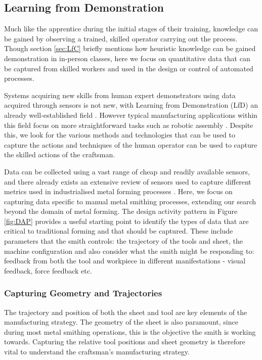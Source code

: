 \subsection{Learning from Demonstration} \label{sec:LfD} 
Much like the apprentice during the initial stages of their training, knowledge can be gained by observing a trained, skilled operator carrying out the process. Though section \ref{sec:LfC} briefly mentions how heuristic knowledge can be gained demonstration in in-person classes, here we focus on quantitative data that can be captured from skilled workers and used in the design or control of automated processes.

Systems acquiring new skills from human expert demonstrators using data acquired through sensors is not new, with Learning from Demonstration (LfD)  an already well-established field \citep{Ravichandar2020RecentDemonstration}. 
However typical manufacturing applications within this field focus on more straightforward tasks such as robotic assembly \citep{Zhu2018RobotSurvey}. Despite this, we look for the various methods and technologies that can be used to capture the actions and techniques of the human operator can be used to capture the skilled actions of the craftsman.

Data can be collected using a vast range of cheap and readily available sensors, and there already exists an extensive review of sensors used to capture different metrics used in industrialised metal forming processes \citep{Allwood2016Closed-loopForming}. Here, we focus on capturing data specific to manual metal smithing processes, extending our search beyond the domain of metal forming. The design activity pattern in Figure \ref{fig:DAP} provides a useful starting point to identify the types of data that are critical to traditional forming and that should be captured. These include parameters that the smith controls: the trajectory of the tools and sheet, the machine configuration and also consider what the smith might be responding to: feedback from both the tool and workpiece in different manifestations - visual feedback, force feedback etc. 

\subsubsection{Capturing Geometry and Trajectories}
The trajectory and position of both the sheet and tool are key elements of the manufacturing strategy. The geometry of the sheet is also paramount, since during most metal smithing operations, this is the objective the smith is working towards. Capturing the relative tool positions and sheet geometry is therefore vital to understand the craftsman’s manufacturing strategy.

